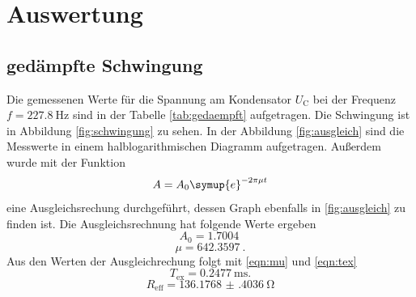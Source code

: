 \section{Auswertung}
\label{sec:Auswertung}

\subsection{gedämpfte Schwingung}
\label{sec:gedaempft}
Die gemessenen Werte für die Spannung am Kondensator $U_\text{C}$ bei der Frequenz $f = \SI{227.8}{\hertz}$ sind in der Tabelle \ref{tab:gedaempft} aufgetragen.
Die Schwingung ist in Abbildung \ref{fig:schwingung} zu sehen.
In der Abbildung \ref{fig:ausgleich} sind die Messwerte in einem halblogarithmischen Diagramm aufgetragen.
Außerdem wurde mit der Funktion 
\begin{equation}
    A = A_0 \symup{e}^{-2 \pi \mu t}
\end{equation}
eine Ausgleichsrechung durchgeführt, dessen Graph ebenfalls in \ref{fig:ausgleich} zu finden ist.
Die Ausgleichsrechnung hat folgende Werte ergeben
\begin{equation*}
    A_0 = \SI{1.7004}{}
\end{equation*}
\begin{equation*}
    \mu = \SI{642.3597}{}.
\end{equation*}
Aus den Werten der Ausgleichrechung folgt mit \eqref{eqn:mu} und \eqref{eqn:tex}
\begin{equation*}
    T_\text{ex} = \SI{0.2477}{\milli\second}.
\end{equation*}
\begin{equation*}
    R_\text{eff} = \SI{136.1768(4036)}{\ohm}
\end{equation*}

